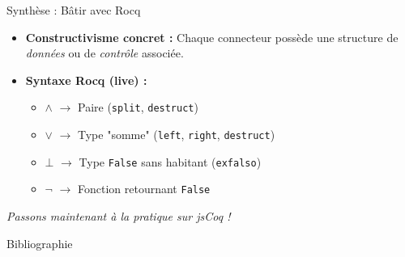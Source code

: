 \documentclass[aspectratio=169]{beamer}
\begin{document}
\begin{frame}{Synthèse : Bâtir avec Rocq}
  \begin{itemize}
    \item \textbf{Constructivisme concret :} Chaque connecteur possède une structure de \emph{données} ou de \emph{contrôle} associée.
    \item \textbf{Syntaxe Rocq (live) :}
      \begin{itemize}
        \item $\land$ $\rightarrow$ Paire (\texttt{split}, \texttt{destruct})
        \item $\lor$ $\rightarrow$ Type "somme" (\texttt{left}, \texttt{right}, \texttt{destruct})
        \item $\bot$ $\rightarrow$ Type \texttt{False} sans habitant (\texttt{exfalso})
        \item $\neg$ $\rightarrow$ Fonction retournant \texttt{False}
      \end{itemize}
  \end{itemize}
  \vspace{0.5cm}
  \begin{center}
    \emph{Passons maintenant à la pratique sur jsCoq !}
  \end{center}
\end{frame}

\begin{frame}[allowframebreaks]{Bibliographie}
  \nocite{troelstraHistoryConstructivism20th2011}
  
  
\end{frame}
\end{document}
